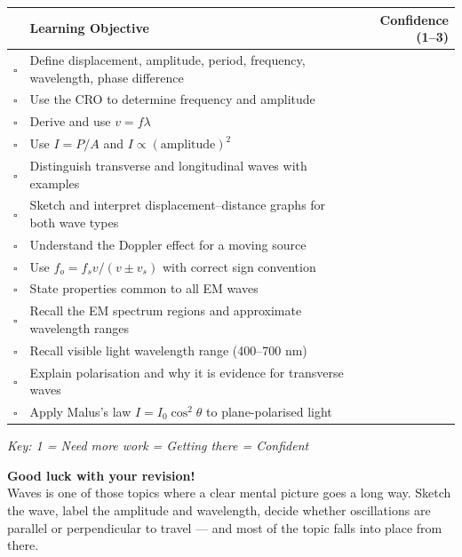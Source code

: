 \begin{tcolorbox}[colback=white, colframe=darkblue, breakable]
\renewcommand{\arraystretch}{1.5}
\begin{tabular}{@{} c p{10.5cm} r @{}}
\toprule
 & \textbf{Learning Objective} & \textbf{Confidence (1--3)} \\
\midrule
$\square$ & Define displacement, amplitude, period, frequency, wavelength, phase difference & \\
$\square$ & Use the CRO to determine frequency and amplitude & \\
$\square$ & Derive and use $v = f\lambda$ & \\
$\square$ & Use $I = P/A$ and $I \propto (\text{amplitude})^2$ & \\
$\square$ & Distinguish transverse and longitudinal waves with examples & \\
$\square$ & Sketch and interpret displacement--distance graphs for both wave types & \\
$\square$ & Understand the Doppler effect for a moving source & \\
$\square$ & Use $f_o = f_s v/(v \pm v_s)$ with correct sign convention & \\
$\square$ & State properties common to all EM waves & \\
$\square$ & Recall the EM spectrum regions and approximate wavelength ranges & \\
$\square$ & Recall visible light wavelength range (400--700 nm) & \\
$\square$ & Explain polarisation and why it is evidence for transverse waves & \\
$\square$ & Apply Malus's law $I = I_0\cos^2\theta$ to plane-polarised light & \\
\bottomrule
\end{tabular}
\vspace{0.5em}

\textit{Key: 1 = Need more work  = Getting there  = Confident}
\end{tcolorbox}

\vspace{1em}
\begin{motivationbox}
\centering
\textbf{\color{darkblue}Good luck with your revision!}\\[0.2em]
{\color{darkgray}\small Waves is one of those topics where a clear mental picture goes a long way. Sketch the wave, label the amplitude and wavelength, decide whether oscillations are parallel or perpendicular to travel --- and most of the topic falls into place from there.}
\end{motivationbox}
